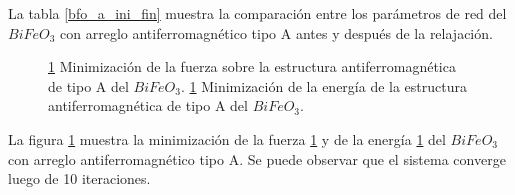 \noindent La tabla \ref{bfo_a_ini_fin} muestra la comparaci\'on entre los 
par\'ametros de red del $BiFeO_{3}$ con arreglo antiferromagn\'etico tipo A 
antes y despu\'es de la relajaci\'on.

\begin{figure}[H]
    \centering
    \singlespace
    \caption[Minimizaci\'on de la fuerza y la energ\'ia del $BiFeO_{3}$ con 
    arreglo antiferromagn\'etico tipo 
    A]{\ref{minimizacion_bfo_A}  Minimizaci\'on de la 
    fuerza sobre la estructura antiferromagn\'etica de tipo A del $BiFeO_{3}$. 
    \ref{minimizacion_bfo_A}  Minimizaci\'on de la 
    energ\'ia de la estructura antiferromagn\'etica de tipo A del $BiFeO_{3}$.}
    \label{minimizacion_bfo_A}
\end{figure}

\noindent La figura \ref{minimizacion_bfo_A} muestra la minimizaci\'on de la 
fuerza \ref{minimizacion_bfo_A}  y de la energ\'ia 
\ref{minimizacion_bfo_A}  del $BiFeO_{3}$ con arreglo 
antiferromagn\'etico tipo A. Se puede observar que el sistema converge luego de 
10 iteraciones.

